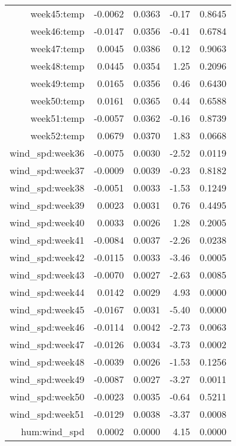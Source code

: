 \begin{table}[ht]
\begin{tabular}{rrrrr}
$$  week45:temp & -0.0062 & 0.0363 & -0.17 & 0.8645 \\ 
  week46:temp & -0.0147 & 0.0356 & -0.41 & 0.6784 \\ 
  week47:temp & 0.0045 & 0.0386 & 0.12 & 0.9063 \\ 
  week48:temp & 0.0445 & 0.0354 & 1.25 & 0.2096 \\ 
  week49:temp & 0.0165 & 0.0356 & 0.46 & 0.6430 \\ 
  week50:temp & 0.0161 & 0.0365 & 0.44 & 0.6588 \\ 
  week51:temp & -0.0057 & 0.0362 & -0.16 & 0.8739 \\ 
  week52:temp & 0.0679 & 0.0370 & 1.83 & 0.0668 \\ 
  wind\_spd:week36 & -0.0075 & 0.0030 & -2.52 & 0.0119 \\ 
  wind\_spd:week37 & -0.0009 & 0.0039 & -0.23 & 0.8182 \\ 
  wind\_spd:week38 & -0.0051 & 0.0033 & -1.53 & 0.1249 \\ 
  wind\_spd:week39 & 0.0023 & 0.0031 & 0.76 & 0.4495 \\ 
  wind\_spd:week40 & 0.0033 & 0.0026 & 1.28 & 0.2005 \\ 
  wind\_spd:week41 & -0.0084 & 0.0037 & -2.26 & 0.0238 \\ 
  wind\_spd:week42 & -0.0115 & 0.0033 & -3.46 & 0.0005 \\ 
  wind\_spd:week43 & -0.0070 & 0.0027 & -2.63 & 0.0085 \\ 
  wind\_spd:week44 & 0.0142 & 0.0029 & 4.93 & 0.0000 \\ 
  wind\_spd:week45 & -0.0167 & 0.0031 & -5.40 & 0.0000 \\ 
  wind\_spd:week46 & -0.0114 & 0.0042 & -2.73 & 0.0063 \\ 
  wind\_spd:week47 & -0.0126 & 0.0034 & -3.73 & 0.0002 \\ 
  wind\_spd:week48 & -0.0039 & 0.0026 & -1.53 & 0.1256 \\ 
  wind\_spd:week49 & -0.0087 & 0.0027 & -3.27 & 0.0011 \\ 
  wind\_spd:week50 & -0.0023 & 0.0035 & -0.64 & 0.5211 \\ 
  wind\_spd:week51 & -0.0129 & 0.0038 & -3.37 & 0.0008 \\ 
  hum:wind\_spd & 0.0002 & 0.0000 & 4.15 & 0.0000 \\ 
   \hline
\end{tabular}
\end{table}
